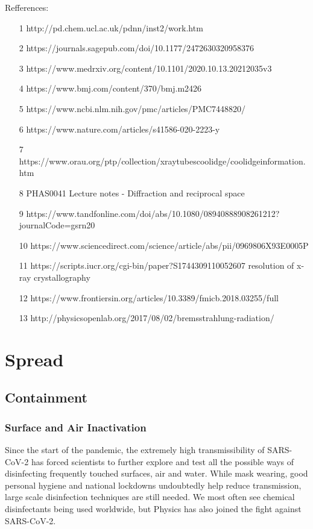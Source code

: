 \documentclass[11pt]{report}
\begin{document}
Refferences:
\begin{itemize}
    \item [1] http://pd.chem.ucl.ac.uk/pdnn/inst2/work.htm
    \item [2] https://journals.sagepub.com/doi/10.1177/2472630320958376
    \item [3] https://www.medrxiv.org/content/10.1101/2020.10.13.20212035v3
    \item [4] https://www.bmj.com/content/370/bmj.m2426
    \item [5] https://www.ncbi.nlm.nih.gov/pmc/articles/PMC7448820/
    \item [6] https://www.nature.com/articles/s41586-020-2223-y
    \item [7] https://www.orau.org/ptp/collection/xraytubescoolidge/coolidgeinformation.htm
    \item [8] PHAS0041 Lecture notes - Diffraction and reciprocal space 
    \item [9] https://www.tandfonline.com/doi/abs/10.1080/08940888908261212?journalCode=gsrn20
    \item [10]  https://www.sciencedirect.com/science/article/abs/pii/0969806X93E0005P
    \item [11] https://scripts.iucr.org/cgi-bin/paper?S1744309110052607 resolution of x-ray crystallography
    \item [12] https://www.frontiersin.org/articles/10.3389/fmicb.2018.03255/full
    \item [13] http://physicsopenlab.org/2017/08/02/bremsstrahlung-radiation/
\end{itemize}

	\chapter{Spread}
		\section{Containment}
			\subsection{Surface and Air Inactivation}
				

Since the start of the pandemic, the extremely high transmissibility of SARS-CoV-2 has forced scientists to further explore and test all the possible ways of disinfecting frequently touched surfaces, air and water. While mask wearing, good personal hygiene and national lockdowns undoubtedly help reduce transmission, large scale disinfection techniques are still needed. We most often see chemical disinfectants being used worldwide, but Physics has also joined the fight against SARS-CoV-2. 
\end{document}
